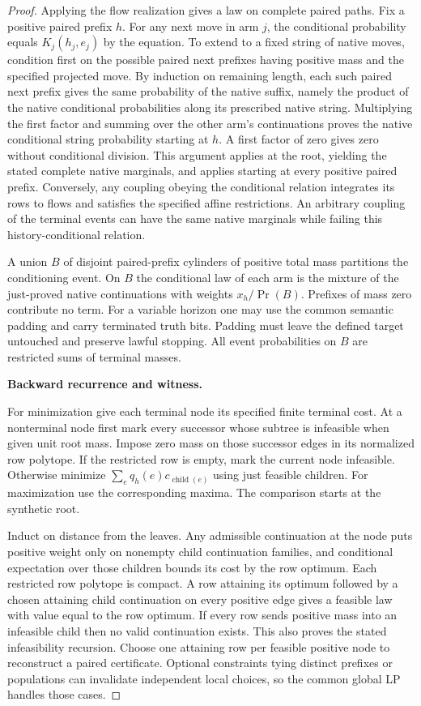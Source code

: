 \begin{proof}
Applying the flow realization gives a law on complete paired paths. Fix a positive paired prefix \(h\). For any next move in arm \(j\), the conditional probability equals \(K_j(h_j,e_j)\) by the equation. To extend to a fixed string of native moves, condition first on the possible paired next prefixes having positive mass and the specified projected move. By induction on remaining length, each such paired next prefix gives the same probability of the native suffix, namely the product of the native conditional probabilities along its prescribed native string. Multiplying the first factor and summing over the other arm's continuations proves the native conditional string probability starting at \(h\). A first factor of zero gives zero without conditional division. This argument applies at the root, yielding the stated complete native marginals, and applies starting at every positive paired prefix. Conversely, any coupling obeying the conditional relation integrates its rows to flows and satisfies the specified affine restrictions. An arbitrary coupling of the terminal events can have the same native marginals while failing this history-conditional relation.

A union \(B\) of disjoint paired-prefix cylinders of positive total mass partitions the conditioning event. On \(B\) the conditional law of each arm is the mixture of the just-proved native continuations with weights \(x_h/\Pr(B)\). Prefixes of mass zero contribute no term. For a variable horizon one may use the common semantic padding and carry terminated truth bits. Padding must leave the defined target untouched and preserve lawful stopping. All event probabilities on \(B\) are restricted sums of terminal masses.

\textbf{Backward recurrence and witness.}

For minimization give each terminal node its specified finite terminal cost. At a nonterminal node first mark every successor whose subtree is infeasible when given unit root mass. Impose zero mass on those successor edges in its normalized row polytope. If the restricted row is empty, mark the current node infeasible. Otherwise minimize \(\sum_e q_h(e)c_{\operatorname{child}(e)}\) using just feasible children. For maximization use the corresponding maxima. The comparison starts at the synthetic root.

Induct on distance from the leaves. Any admissible continuation at the node puts positive weight only on nonempty child continuation families, and conditional expectation over those children bounds its cost by the row optimum. Each restricted row polytope is compact. A row attaining its optimum followed by a chosen attaining child continuation on every positive edge gives a feasible law with value equal to the row optimum. If every row sends positive mass into an infeasible child then no valid continuation exists. This also proves the stated infeasibility recursion. Choose one attaining row per feasible positive node to reconstruct a paired certificate. Optional constraints tying distinct prefixes or populations can invalidate independent local choices, so the common global LP handles those cases.


\end{proof}
